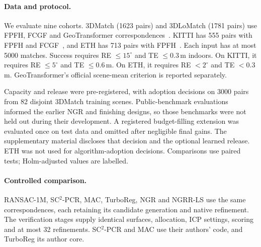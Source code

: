 \paragraph{Data and protocol.}\label{sec:protocol} We evaluate nine cohorts. 3DMatch (1623 pairs) and 3DLoMatch (1781 pairs) use FPFH, FCGF and GeoTransformer correspondences~\cite{zeng2017match,huang2021predator,rusu2009fpfh,choy2019fcgf,qin2022geotransformer}. KITTI has 555 pairs with FPFH and FCGF~\cite{geiger2012kitti}, and ETH has 713 pairs with FPFH~\cite{pomerleau2012eth}. Each input has at most 5000 matches. Success requires RE $\le15^\circ$ and TE $\le0.3$\,m indoors. On KITTI, it requires RE $\le5^\circ$ and TE $\le0.6$\,m. On ETH, it requires RE $<2^\circ$ and TE $<0.3$\,m. GeoTransformer's official scene-mean criterion is reported separately.

Capacity and release were pre-registered, with adoption decisions on 3000 pairs from 82 disjoint 3DMatch training scenes. Public-benchmark evaluations informed the earlier NGR and finishing designs, so those benchmarks were not held out during their development. A registered budget-filling extension was evaluated once on test data and omitted after negligible final gains. The supplementary material discloses that decision and the optional learned release. ETH was not used for algorithm-adoption decisions. Comparisons use paired tests; Holm-adjusted values are labelled.

\paragraph{Controlled comparison.} RANSAC-1M, SC$^2$-PCR, MAC, TurboReg, NGR and NGRR-LS use the same correspondences, each retaining its candidate generation and native refinement. The verification stages supply identical surfaces, allocation, ICP settings, scoring and at most 32 refinements. SC$^2$-PCR and MAC use their authors' code, and TurboReg its author core.
